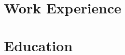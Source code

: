 \documentclass[11pt, oneside, letterpaper, titlepage]{article}
\begin{document}
\begin{tcolorbox}
\begin{minipage}[t]{5.5in}
\begin{tcolorbox}[grow to right by=0.01in,colframe=white,colback=white,arc=0mm]
			\section*{Work Experience}
			\section*{Education}
		\end{tcolorbox}
	\end{minipage}
\end{tcolorbox}
\end{document}
